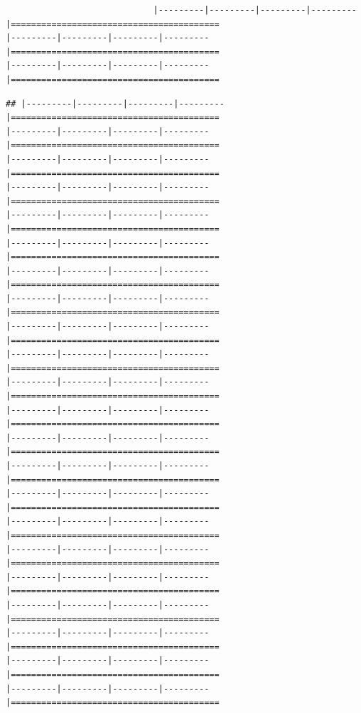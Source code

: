 \documentclass[
]{article}
\begin{document}
\begin{verbatim}
                             |---------|---------|---------|---------|=========================================                                          |---------|---------|---------|---------|=========================================                                          |---------|---------|---------|---------|=========================================                                          
\end{verbatim}

\begin{verbatim}
## |---------|---------|---------|---------|=========================================                                          |---------|---------|---------|---------|=========================================                                          |---------|---------|---------|---------|=========================================                                          |---------|---------|---------|---------|=========================================                                          |---------|---------|---------|---------|=========================================                                          |---------|---------|---------|---------|=========================================                                          |---------|---------|---------|---------|=========================================                                          |---------|---------|---------|---------|=========================================                                          |---------|---------|---------|---------|=========================================                                          |---------|---------|---------|---------|=========================================                                          |---------|---------|---------|---------|=========================================                                          |---------|---------|---------|---------|=========================================                                          |---------|---------|---------|---------|=========================================                                          |---------|---------|---------|---------|=========================================                                          |---------|---------|---------|---------|=========================================                                          |---------|---------|---------|---------|=========================================                                          |---------|---------|---------|---------|=========================================                                          |---------|---------|---------|---------|=========================================                                          |---------|---------|---------|---------|=========================================                                          |---------|---------|---------|---------|=========================================                                          |---------|---------|---------|---------|=========================================                                          |---------|---------|---------|---------|=========================================                                          
\end{verbatim}
\end{document}
